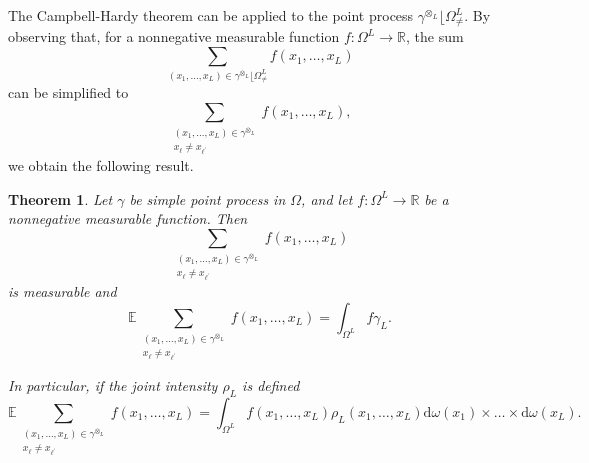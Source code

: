 \documentclass[twoside,11pt]{book}
\newtheorem{theorem}{Theorem}
\numberwithin{theorem}{chapter}
\numberwithin{definition}{chapter}
\numberwithin{proposition}{chapter}
\numberwithin{corollary}{chapter}
\numberwithin{example}{chapter}
\numberwithin{lemma}{chapter}
\begin{document}
The Campbell-Hardy theorem can be applied to the point process $\gamma^{\otimes_{L}} \lfloor \Omega_{\neq}^{L}$. By observing that, for a nonnegative measurable function $f: \Omega^{L} \rightarrow \mathbb{R}$, the sum
\begin{equation}\label{eq:sum_over_configurations_campbell}
\sum\limits_{(x_{1}, \dots, x_{L}) \in \gamma^{\otimes_{L}} \lfloor \Omega_{\neq}^{L}} f(x_{1}, \dots, x_{L})
\end{equation}
can be simplified to 
\begin{equation}
\sum\limits_{\substack{(x_{1}, \dots, x_{L}) \in \gamma^{\otimes_{L}} \\ x_{\ell} \neq x_{\ell^{'}}}} f(x_{1}, \dots, x_{L}),
\end{equation}
we obtain the following result.
\begin{theorem}
Let $\gamma$ be simple point process in $\Omega$, and let $f: \Omega^{L} \rightarrow \mathbb{R}$ be a nonnegative measurable function. Then  
\begin{equation}
\sum\limits_{\substack{(x_{1}, \dots, x_{L}) \in \gamma^{\otimes_{L}} \\ x_{\ell} \neq x_{\ell^{'}}}} f(x_{1}, \dots, x_{L})
\end{equation}
is measurable and
\begin{equation}
\mathbb{E} \sum\limits_{\substack{(x_{1}, \dots, x_{L}) \in \gamma^{\otimes_{L}} \\ x_{\ell} \neq x_{\ell^{'}}}} f(x_{1}, \dots, x_{L}) = \int_{\Omega^{L}} f \gamma_{L}.
\end{equation}


In particular, if the joint intensity $\rho_L$ is defined
\begin{equation}
\mathbb{E}\sum\limits_{\substack{(x_{1}, \dots, x_{L}) \in \gamma^{\otimes_{L}} \\ x_{\ell} \neq x_{\ell^{'}}}} f(x_{1}, \dots, x_{L}) = \int_{\Omega^{L}} f(x_{1}, \dots, x_{L}) \rho_{L}(x_{1}, \dots, x_{L}) \mathrm{d}\omega(x_{1}) \times \dots \times \mathrm{d}\omega(x_{L}).
\end{equation}

\end{theorem}


\end{document}
